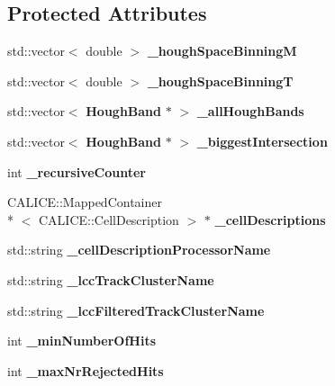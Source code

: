 \subsection*{Protected Attributes}
\begin{DoxyCompactItemize}
\item 
std\-::vector$<$ double $>$ {\bfseries \-\_\-hough\-Space\-Binning\-M}\label{classHCalTrackFilter_aca9c7072b7b890c2b5a7e837e5f5aace}

\item 
std\-::vector$<$ double $>$ {\bfseries \-\_\-hough\-Space\-Binning\-T}\label{classHCalTrackFilter_a37d51653b75afd2d49c3b14c7d7f3975}

\item 
std\-::vector$<$ {\bf Hough\-Band} $\ast$ $>$ {\bfseries \-\_\-all\-Hough\-Bands}\label{classHCalTrackFilter_a269b9de68d416296a85513a5055a1de7}

\item 
std\-::vector$<$ {\bf Hough\-Band} $\ast$ $>$ {\bfseries \-\_\-biggest\-Intersection}\label{classHCalTrackFilter_acdc46ed6288b80bdfa02e059d715ad4e}

\item 
int {\bfseries \-\_\-recursive\-Counter}\label{classHCalTrackFilter_a0d0612b016022c9b2ba7f8dd78be9be9}

\item 
C\-A\-L\-I\-C\-E\-::\-Mapped\-Container\\*
$<$ C\-A\-L\-I\-C\-E\-::\-Cell\-Description $>$ $\ast$ {\bfseries \-\_\-cell\-Descriptions}\label{classHCalTrackFilter_a3e0c3d717120ad1db2d78e0799e67d4a}

\item 
std\-::string {\bfseries \-\_\-cell\-Description\-Processor\-Name}\label{classHCalTrackFilter_aba43cb0e3543f152a94c612fef0a5d7d}

\item 
std\-::string {\bfseries \-\_\-lcc\-Track\-Cluster\-Name}\label{classHCalTrackFilter_a2b8f5be022e46d4490deb2145c3ca7f4}

\item 
std\-::string {\bfseries \-\_\-lcc\-Filtered\-Track\-Cluster\-Name}\label{classHCalTrackFilter_a0d282b7afe432306d80bf825f17e90da}

\item 
int {\bfseries \-\_\-min\-Number\-Of\-Hits}\label{classHCalTrackFilter_a2741e0107f22d5591b8a7b113e63e610}

\item 
int {\bfseries \-\_\-max\-Nr\-Rejected\-Hits}\label{classHCalTrackFilter_aa62684492d509b45ff1ac83bc7e66322}


\end{DoxyCompactItemize}

